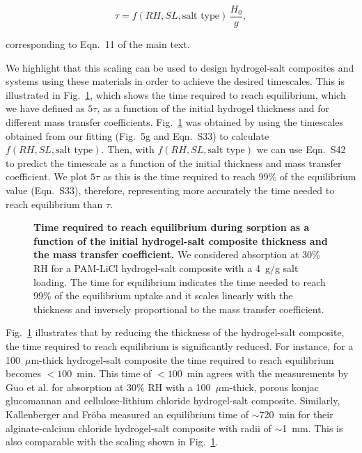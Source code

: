 \documentclass[11pt]{article}
\begin{document}
\begin{equation}
\tau = f(RH, SL, \text{salt type})\, \frac{H_0}{g}, \tag{S42}
\end{equation}

corresponding to Eqn.~11 of the main text.

We highlight that this scaling can be used to design hydrogel-salt composites and systems using these materials in order to achieve the desired timescales. This is illustrated in Fig.~\ref{fig:S10}, which shows the time required to reach equilibrium, which we have defined as $5\tau$, as a function of the initial hydrogel thickness and for different mass transfer coefficients. Fig.~\ref{fig:S10} was obtained by using the timescales obtained from our fitting (Fig.~5g and Eqn.~S33) to calculate $f(RH, SL, \text{salt type})$. Then, with $f(RH, SL, \text{salt type})$ we can use Eqn.~S42 to predict the timescale as a function of the initial thickness and mass transfer coefficient. We plot $5\tau$ as this is the time required to reach 99\% of the equilibrium value (Eqn.~S33), therefore, representing more accurately the time needed to reach equilibrium than $\tau$.

\begin{figure}[htbp]
\centering
{}
\caption{\textbf{Time required to reach equilibrium during sorption as a function of the initial hydrogel-salt composite thickness and the mass transfer coefficient.} We considered absorption at 30\% RH for a PAM-LiCl hydrogel-salt composite with a 4~g/g salt loading. The time for equilibrium indicates the time needed to reach 99\% of the equilibrium uptake and it scales linearly with the thickness and inversely proportional to the mass transfer coefficient.}
\label{fig:S10}
\end{figure}

Fig.~\ref{fig:S10} illustrates that by reducing the thickness of the hydrogel-salt composite, the time required to reach equilibrium is significantly reduced. For instance, for a 100~$\mu$m-thick hydrogel-salt composite the time required to reach equilibrium becomes $<100$~min. This time of $<100$~min agrees with the measurements by Guo et al.\cite{guo2022} for absorption at 30\% RH with a 100~$\mu$m-thick, porous konjac glucomannan and cellulose-lithium chloride hydrogel-salt composite. Similarly, Kallenberger and Fr\"oba\cite{kallenberger2018} measured an equilibrium time of $\sim$720~min for their alginate-calcium chloride hydrogel-salt composite with radii of $\sim$1~mm. This is also comparable with the scaling shown in Fig.~\ref{fig:S10}.
\end{document}
